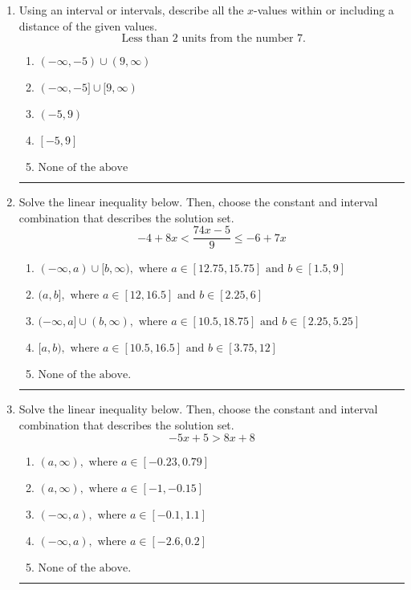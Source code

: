 \documentclass[14pt]{extbook}
\newcommand{\litem}[1]{\item#1\hspace*{-1cm}\rule{\textwidth}{0.4pt}}
\begin{document}
\begin{enumerate}
{\begin{enumerate}[label=\Alph*.]
\end{enumerate} }
\litem{
Using an interval or intervals, describe all the $x$-values within or including a distance of the given values.\[ \text{ Less than } 2 \text{ units from the number } 7. \]\begin{enumerate}[label=\Alph*.]
\item \( (-\infty, -5) \cup (9, \infty) \)
\item \( (-\infty, -5] \cup [9, \infty) \)
\item \( (-5, 9) \)
\item \( [-5, 9] \)
\item \( \text{None of the above} \)

\end{enumerate} }
\litem{
Solve the linear inequality below. Then, choose the constant and interval combination that describes the solution set.\[ -4 + 8 x < \frac{74 x - 5}{9} \leq -6 + 7 x \]\begin{enumerate}[label=\Alph*.]
\item \( (-\infty, a) \cup [b, \infty), \text{ where } a \in [12.75, 15.75] \text{ and } b \in [1.5, 9] \)
\item \( (a, b], \text{ where } a \in [12, 16.5] \text{ and } b \in [2.25, 6] \)
\item \( (-\infty, a] \cup (b, \infty), \text{ where } a \in [10.5, 18.75] \text{ and } b \in [2.25, 5.25] \)
\item \( [a, b), \text{ where } a \in [10.5, 16.5] \text{ and } b \in [3.75, 12] \)
\item \( \text{None of the above.} \)

\end{enumerate} }
\litem{
Solve the linear inequality below. Then, choose the constant and interval combination that describes the solution set.\[ -5x + 5 > 8x + 8 \]\begin{enumerate}[label=\Alph*.]
\item \( (a, \infty), \text{ where } a \in [-0.23, 0.79] \)
\item \( (a, \infty), \text{ where } a \in [-1, -0.15] \)
\item \( (-\infty, a), \text{ where } a \in [-0.1, 1.1] \)
\item \( (-\infty, a), \text{ where } a \in [-2.6, 0.2] \)
\item \( \text{None of the above}. \)


\end{enumerate}}
\end{enumerate}
\end{document}

